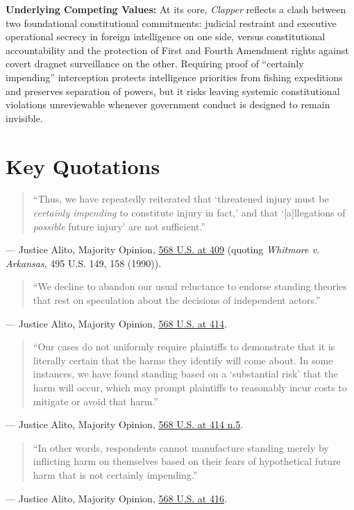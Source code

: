 \documentclass[12pt]{article}
\begin{document}
\textbf{Underlying Competing Values:} At its core, \textit{Clapper} reflects a clash between two foundational constitutional commitments: judicial restraint and executive operational secrecy in foreign intelligence on one side, versus constitutional accountability and the protection of First and Fourth Amendment rights against covert dragnet surveillance on the other. Requiring proof of ``certainly impending'' interception protects intelligence priorities from fishing expeditions and preserves separation of powers, but it risks leaving systemic constitutional violations unreviewable whenever government conduct is designed to remain invisible.

\section{Key Quotations}

\begin{quote}
``Thus, we have repeatedly reiterated that `threatened injury must be \textit{certainly impending} to constitute injury in fact,' and that `[a]llegations of \textit{possible} future injury' are not sufficient.''
\end{quote}
\noindent --- Justice Alito, Majority Opinion, \href{https://tile.loc.gov/storage-services/service/ll/usrep/usrep568/usrep568398/usrep568398.pdf}{568 U.S. at 409} (quoting \textit{Whitmore v. Arkansas}, 495 U.S. 149, 158 (1990)).

\begin{quote}
``We decline to abandon our usual reluctance to endorse standing theories that rest on speculation about the decisions of independent actors.''
\end{quote}
\noindent --- Justice Alito, Majority Opinion, \href{https://supreme.justia.com/cases/federal/us/568/398/}{568 U.S. at 414}.

\begin{quote}
``Our cases do not uniformly require plaintiffs to demonstrate that it is literally certain that the harms they identify will come about. In some instances, we have found standing based on a `substantial risk' that the harm will occur, which may prompt plaintiffs to reasonably incur costs to mitigate or avoid that harm.''
\end{quote}
\noindent --- Justice Alito, Majority Opinion, \href{https://supreme.justia.com/cases/federal/us/568/398/}{568 U.S. at 414 n.5}.

\begin{quote}
``In other words, respondents cannot manufacture standing merely by inflicting harm on themselves based on their fears of hypothetical future harm that is not certainly impending.''
\end{quote}
\noindent --- Justice Alito, Majority Opinion, \href{https://supreme.justia.com/cases/federal/us/568/398/}{568 U.S. at 416}.
\end{document}
